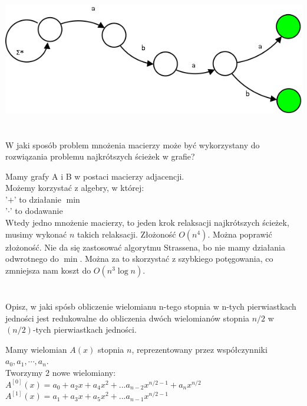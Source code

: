 \documentclass[svgnames]{report}
\begin{document}
\includegraphics[scale=0.55]{images/22.png}

\section{}
\begin{framed}
W jaki sposób problem mnożenia macierzy może być wykorzystany do rozwiązania problemu najkrótszych ścieżek w grafie?
\end{framed}

Mamy grafy A i B w postaci macierzy adjacencji.\\
Możemy korzystać z algebry, w której:\\
'$+$' to działanie $\min$\\
'$\cdot$' to dodawanie\\
Wtedy jedno mnożenie macierzy, to jeden krok relaksacji najkrótszych ścieżek, musimy wykonać $n$ takich relaksacji. Złożoność $O(n^4)$. Można poprawić złożoność. Nie da się zastosować algorytmu Strassena, bo nie mamy działania odwrotnego do $\min$. Można za to skorzystać z szybkiego potęgowania, co zmniejsza nam koszt do $O(n^3\log n)$.

\section{}
\begin{framed}
Opisz, w jaki spósb obliczenie wielomianu n-tego stopnia w n-tych pierwiastkach jedności jest redukowalne do obliczenia dwóch wielomianów stopnia $n/2$ w $(n/2)$-tych pierwiastkach jedności.
\end{framed}

Mamy wielomian $A(x)$ stopnia $n$, reprezentowany przez współczynniki $a_0, a_1, \cdots, a_n$.\\
Tworzymy $2$ nowe wielomiany:\\
$A^{[0]}(x)=a_0 + a_2 x + a_4 x^2 + ... a_{n-2} x^{n/2 -1} + a_n x^{n/2}$\\
$A^{[1]}(x)=a_1 + a_3 x + a_5 x^2 + ... a_{n-1} x^{n/2 -1}$\\
\end{document}
